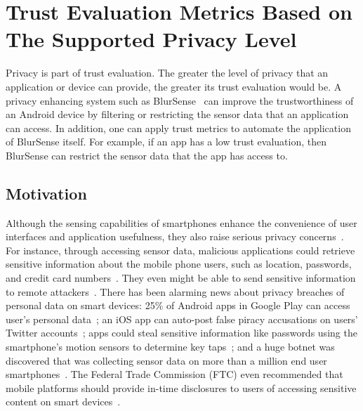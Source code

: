 \section{Trust Evaluation Metrics Based on The Supported Privacy Level}
\label{sec:blursense}
Privacy is part of trust evaluation.
The greater the level of privacy that an application or device can provide, the greater its trust evaluation would be.
A privacy enhancing system such as BlurSense~\cite{cappos2014blursense} can improve the trustworthiness of an Android device  
 by filtering or restricting the sensor data that an application can access.
In addition,
one can apply trust metrics to automate the application of BlurSense itself.  For example, if an app has a low trust evaluation,
then BlurSense can restrict the sensor data that the app has access to.

\subsection{Motivation}
Although the sensing capabilities of smartphones enhance the convenience of user interfaces and
application usefulness, they also raise serious privacy
concerns~\cite{shabtai2010google}. For instance, through accessing sensor data,
malicious applications could retrieve sensitive information about the mobile
phone users, such as location, passwords, and credit card numbers~\cite{xu2012taplogger, 
miluzzo2012tapprints, xu2009stealthy, cai2011touchlogger}. They
even might be able to send sensitive information to remote
attackers~\cite{schlegel2011soundcomber, marquardt2011sp}. There
has been alarming news about privacy breaches of personal data on smart devices:
25\% of Android apps in Google Play can access user's personal
data~\cite{toomuch}; an iOS app can auto-post false piracy accusations on users'
Twitter accounts~\cite{tweetios}; apps could steal sensitive information like
passwords using the smartphone's motion sensors to determine key 
taps~\cite{xu2012taplogger}; and a huge botnet was discovered that was collecting sensor data
on more than a million end user smartphones~\cite{botnet}. The
Federal Trade Commission (FTC) even recommended that mobile platforms should
provide in-time disclosures to users of accessing sensitive content on smart
devices~\cite{ftc}. 

